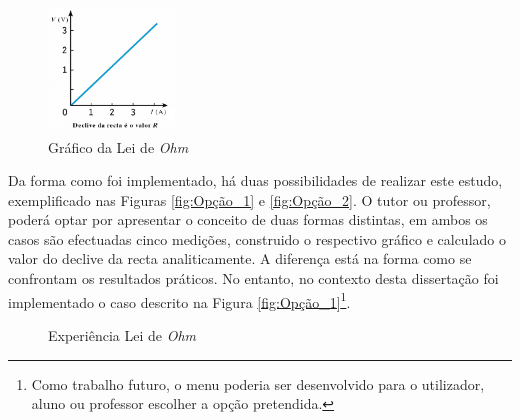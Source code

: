 \begin{figure}[hbtp]
	\centering
	\includegraphics[width=0.3\textwidth]{figures/grafico_Ohm.png}
	\caption{Gráfico da Lei de \textit{Ohm}}
	\label{fig:graphohm}
\end{figure}

Da forma como foi implementado, há duas possibilidades de realizar este estudo, exemplificado nas Figuras \ref{fig:Opção_1} e \ref{fig:Opção_2}. O tutor ou professor, poderá optar por apresentar o conceito de duas formas distintas, em ambos os casos são efectuadas cinco medições, construido o respectivo gráfico e calculado o valor do declive da recta analiticamente. A diferença está na forma como se confrontam os resultados práticos. No entanto, no contexto desta dissertação foi  implementado o caso descrito na Figura \ref{fig:Opção_1}\footnote{Como trabalho futuro, o menu poderia ser desenvolvido para o utilizador, aluno ou professor escolher a opção pretendida.}. 

\begin{figure}[hbtp]
	\centering%
		\centering
		\qquad
		\caption{Experiência Lei de \textit{Ohm}}%
		\label{fig:experienciaOHM}%
	\end{figure}

